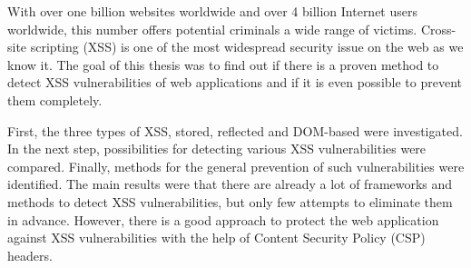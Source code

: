 With over one billion websites worldwide and over 4 billion Internet users worldwide, this number offers potential criminals a wide range of victims. Cross-site scripting (XSS) is one of the most widespread security issue on the web as we know it. The goal of this thesis was to find out if there is a proven method to detect XSS vulnerabilities of web applications and if it is even possible to prevent them completely.

First, the three types of XSS, stored, reflected and DOM-based were investigated. In the next step, possibilities for detecting various XSS vulnerabilities were compared. Finally, methods for the general prevention of such vulnerabilities were identified. The main results were that there are already a lot of frameworks and methods to detect XSS vulnerabilities, but only few attempts to eliminate them in advance. However, there is a good approach to protect the web application against XSS vulnerabilities with the help of Content Security Policy (CSP) headers.